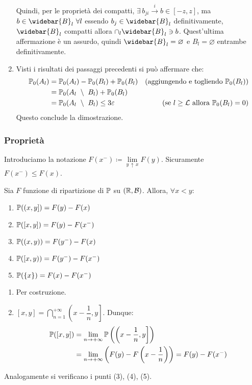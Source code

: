 \begin{dimo}
\begin{enumerate}
      Quindi, per le proprietà dei compatti, $\exists \, b_{ji} \stackrel{i}{\to} b \in [-z, z]$, ma $b \in \widebar{B}_l \ \forall l$ essendo $b_j \in \widebar{B}_l$ definitivamente, $\widebar{B}_l$ compatti allora $\cap_l \widebar{B}_l \ni b$.
      Quest'ultima affermazione è un assurdo, quindi $\widebar{B}_l = \varnothing$ e $B_l = \varnothing$ entrambe definitivamente.

    \item Visti i risultati dei passaggi precedenti si può affermare che:
      \begin{align*}
        \mathbb P_0(A_l) &= \mathbb P_0(A_l) - \mathbb P_0(B_l) + \mathbb P_0(B_l) & (\text{aggiungendo e togliendo } \mathbb P_0(B_l))\\
        &= \mathbb P_0( A_l \ \setminus \ B_l) + \mathbb P_0(B_l) \\
        &= \mathbb P_0(A_l \ \setminus \ B_l) \le 3 \varepsilon &  (\text{se $l \ge \mathcal L$ allora $\mathbb P_0(B_l) =0$})
      \end{align*}
      Questo conclude la dimostrazione. \qedhere
  \end{enumerate}
\end{dimo}


\subsubsection{Proprietà}
Introduciamo la notazione $F(x^-) \coloneqq \lim\limits_{y \, \uparrow \, x} F(y)$.
Sicuramente $F(x^-) \le F(x)$.

\begin{coro}
  Sia $F$ funzione di ripartizione di $\mathbb P$ su $(\mathbb R, \mathcal B)$.
  Allora, $\forall x < y$:
  \begin{enumerate}
  \item $\mathbb P((x, y]) = F(y) - F(x)$
  \item $\mathbb P([x, y]) = F(y) - F(x^-)$
  \item $\mathbb P((x, y)) = F(y^-) - F(x)$
  \item $\mathbb P([x, y)) = F(y^-) - F(x^-)$
  \item $\mathbb P(\{ x \}) = F(x) - F(x^-)$
  \end{enumerate}
\end{coro}

\begin{dimo}
  \leavevmode\vspace{-\baselineskip}
  \begin{enumerate}
  \item Per costruzione.
  \item
    $[x, y] = \bigcap\limits_{n=1}^{+\infty} \left(x - \dfrac 1 n, y \right]$. Dunque: \\
    \begin{align*}
    \mathbb P([x, y])
    &= \lim\limits_{n \to +\infty}
    \mathbb P \left( \left(x - \dfrac 1 n, y \right] \right) \\
    &= \lim\limits_{n \to +\infty}
    \left( F(y) - F \left( x - \dfrac 1 n \right) \right)
    = F(y) - F(x^-)
    \end{align*}
  \end{enumerate}
  Analogamente si verificano i punti (3), (4), (5).
\end{dimo}

